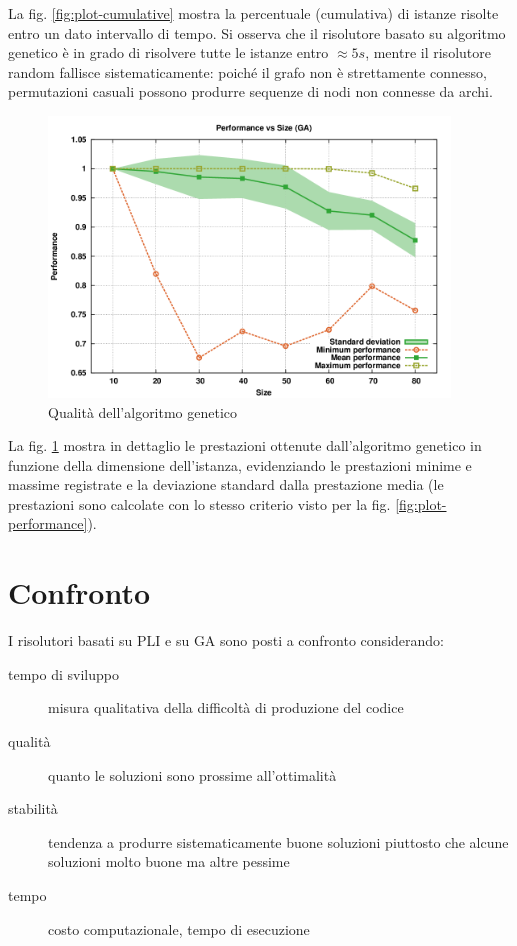 \documentclass[a4paper, 10pt]{report}
\begin{document}
La fig. \ref{fig:plot-cumulative} mostra la percentuale (cumulativa) di
istanze risolte entro un dato intervallo di tempo. Si osserva che il
risolutore basato su algoritmo genetico è in grado di risolvere tutte
le istanze entro $\approx 5s$, mentre il risolutore random fallisce
sistematicamente: poiché il grafo non è strettamente connesso, permutazioni
casuali possono produrre sequenze di nodi non connesse da archi.

\begin{figure}
  \centering
  \includegraphics[width=0.95\textwidth]{images/plot-stability}
  \caption{Qualità dell'algoritmo genetico}
  \label{fig:plot-stability}
\end{figure}

La fig. \ref{fig:plot-stability} mostra in dettaglio le prestazioni ottenute
dall'algoritmo genetico in funzione della dimensione dell'istanza,
evidenziando le prestazioni minime e massime registrate e la deviazione
standard dalla prestazione media (le prestazioni sono calcolate con
lo stesso criterio visto per la fig. \ref{fig:plot-performance}).



\section{Confronto}
\label{sec:analysis_comparison}
I risolutori basati su PLI e su GA sono posti a confronto considerando:
\begin{description}
  \item [tempo di sviluppo] misura qualitativa della difficoltà di
  produzione del codice
  
  \item [qualità] quanto le soluzioni sono prossime all'ottimalità
  
  \item [stabilità] tendenza a produrre sistematicamente buone soluzioni
  piuttosto che alcune soluzioni molto buone ma altre pessime
  
  \item [tempo] costo computazionale, tempo di esecuzione
\end{description}
\end{document}
